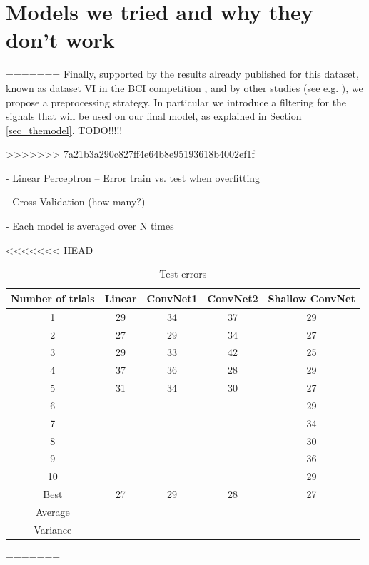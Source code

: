 \documentclass{article}
\begin{document}
 

 
 \section{Models we tried and why they don't work}\label{sec_allmodel}
=======
Finally, supported by the results already published for this dataset, known as dataset VI in the BCI competition \cite{bci_ii}, and by other studies (see e.g. \cite{schirrmeister2017deep}), we propose a preprocessing strategy. 
In particular we introduce a filtering for the signals that will be used on our final model, as explained in Section \ref{sec_themodel}.
TODO!!!!!

>>>>>>> 7a21b3a290c827ff4e64b8e95193618b4002ef1f
 
 - Linear Perceptron --  Error train vs. test when overfitting 
 
 - Cross Validation (how many?)
 
 - Each model is averaged over N times 
 
<<<<<<< HEAD
 \begin{table}
 \begin{center}
    \begin{tabular}{|  c | c | c  | c |c |}
    \hline
    Number of trials & Linear & ConvNet1 & ConvNet2 & Shallow ConvNet \\ \hline
    1 & 29 & 34 & 37 & 29 \\
    2 & 27 & 29 & 34 & 27\\
    3 & 29 & 33 & 42 & 25\\
    4 & 37 & 36 & 28 & 29 \\
    5 & 31& 34 & 30 & 27 \\
    6 & & & & 29 \\
    7 & & & & 34\\
    8 & & & & 30 \\
    9 & & & & 36 \\
    10 & & & & 29 \\
        \hline
    Best & 27  & 29 & 28 &27 \\
    Average & & & &\\
    Variance & & & &\\
        \hline
    \end{tabular}
        \caption{Test errors}
\end{center}
\end{table}
=======
\end{document}
